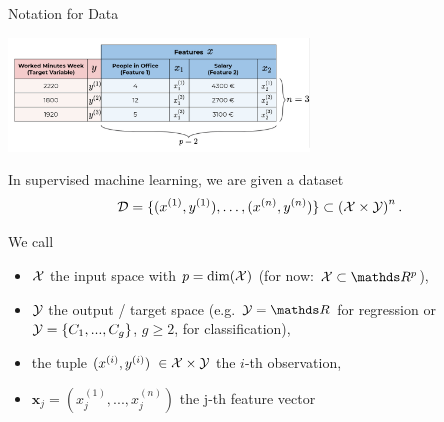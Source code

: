\documentclass[11pt,compress,t,notes=noshow, xcolor=table]{beamer}
\begin{document}
\begin{vbframe}{Notation for Data}

\scriptsize

\begin{center}\includegraphics[width=0.6\textwidth]{figure_man/data_table} \end{center}

\normalsize

\vspace{-0.5cm}

In supervised machine learning, we are given a dataset
\[
\mathcal{D} = \{ (x^{(1)}, y^{(1)}), \ldots, (x^{(n)}, y^{(n)})\} \subset \left(\mathcal{X} \times \mathcal{Y}\right)^n.
\]

We call

\begin{itemize}
  \item $\mathcal{X}$  the input space with $p = \text{dim}(\mathcal{X})$ (for now: $\Xspace \subset \R^p$),
  \item $\mathcal{Y}$ the output / target space (e.g. $\Yspace = \R$ for regression or $\mathcal{Y} = \{C_1, ..., C_g\}$, $g \ge 2$, for classification),
  \item the tuple \((x^{(i)}, y^{(i)})\) $\in \mathcal{X}\times \mathcal{Y}$ the \(i\)-th observation,
  \item $\bm{x}_j = \left(x^{(1)}_j, ..., x^{(n)}_j\right)$ the j-th feature vector
\end{itemize}

\end{vbframe}
\end{document}

